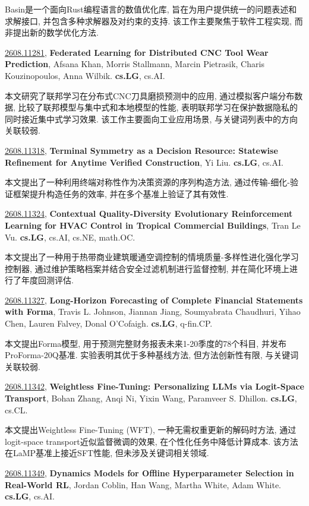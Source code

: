 \documentclass[9pt, a4paper]{article}
\theoremstyle{plain}
\theoremstyle{definition}
\theoremstyle{remark}
\newcommand{\arxivwithtarget}[3]{\hypertarget{#1}{}\href{https://arxiv.org/abs/#1}{#1}, \textbf{\textcolor{arxivblue}{#2}}, #3. }
\begin{document}
Basin是一个面向Rust编程语言的数值优化库, 旨在为用户提供统一的问题表述和求解接口, 并包含多种求解器及对约束的支持. 该工作主要聚焦于软件工程实现, 而非提出新的数学优化方法.


\arxivwithtarget{2608.11281}{Federated Learning for Distributed CNC Tool Wear Prediction}{Afsana Khan, Morris Stallmann, Marcin Pietrasik, Charis Kouzinopoulos, Anna Wilbik}\textbf{cs.LG}, cs.AI.

本文研究了联邦学习在分布式CNC刀具磨损预测中的应用, 通过模拟客户端分布数据, 比较了联邦模型与集中式和本地模型的性能, 表明联邦学习在保护数据隐私的同时接近集中式学习效果. 该工作主要面向工业应用场景, 与关键词列表中的方向关联较弱.


\arxivwithtarget{2608.11318}{Terminal Symmetry as a Decision Resource: Statewise Refinement for Anytime Verified Construction}{Yi Liu}\textbf{cs.LG}, cs.AI.

本文提出了一种利用终端对称性作为决策资源的序列构造方法, 通过传输-细化-验证框架提升构造任务的效率, 并在多个基准上验证了其有效性.


\arxivwithtarget{2608.11324}{Contextual Quality-Diversity Evolutionary Reinforcement Learning for HVAC Control in Tropical Commercial Buildings}{Tran Le Vu}\textbf{cs.LG}, cs.AI, cs.NE, math.OC.

本文提出了一种用于热带商业建筑暖通空调控制的情境质量-多样性进化强化学习控制器, 通过维护策略档案并结合安全过滤机制进行监督控制, 并在简化环境上进行了年度回测评估.


\arxivwithtarget{2608.11327}{Long-Horizon Forecasting of Complete Financial Statements with Forma}{Travis L. Johnson, Jiannan Jiang, Soumyabrata Chaudhuri, Yihao Chen, Lauren Falvey, Donal O'Cofaigh}\textbf{cs.LG}, q-fin.CP.

本文提出Forma模型, 用于预测完整财务报表未来1-20季度的78个科目, 并发布ProForma-20Q基准. 实验表明其优于多种基线方法, 但方法创新性有限, 与关键词关联较弱.


\arxivwithtarget{2608.11342}{Weightless Fine-Tuning: Personalizing LLMs via Logit-Space Transport}{Bohan Zhang, Anqi Ni, Yixin Wang, Paramveer S. Dhillon}\textbf{cs.LG}, cs.CL.

本文提出Weightless Fine-Tuning (WFT), 一种无需权重更新的解码时方法, 通过logit-space transport近似监督微调的效果, 在个性化任务中降低计算成本. 该方法在LaMP基准上接近SFT性能, 但未涉及关键词相关领域.


\arxivwithtarget{2608.11349}{Dynamics Models for Offline Hyperparameter Selection in Real-World RL}{Jordan Coblin, Han Wang, Martha White, Adam White}\textbf{cs.LG}, cs.AI.
\end{document}
